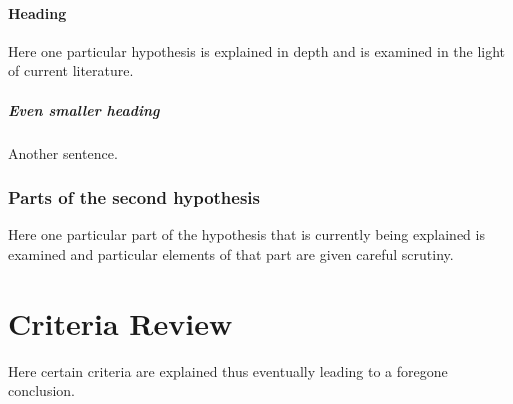\paragraph{Heading} Here one particular hypothesis is explained in depth
and is examined in the light of current literature. \subparagraph{Even smaller heading} Another sentence.

\subsubsection{Parts of the second hypothesis}

Here one particular part of the hypothesis that is 
currently being explained is examined and particular
elements of that part are given careful scrutiny.

\section{Criteria Review}

Here certain criteria are explained thus eventually
leading to a foregone conclusion.
